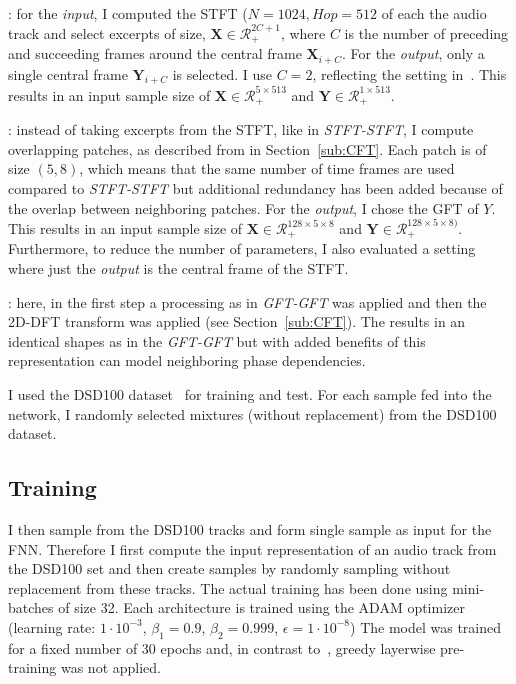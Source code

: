 \begin{description}[style=unboxed,leftmargin=0cm]
\item[STFT-STFT]: for the \emph{input}, I computed the STFT (\(N=1024, Hop=512\) of each the audio track and select excerpts of size, \(\mathbf{X} \in \mathcal{R}^{2C + 1}_{+} \), where \(C\) is the number of preceding and succeeding frames around the central frame \(\mathbf{X}_{i+C}\). For the \emph{output}, only a single central frame \(\mathbf{Y}_{i+C}\) is selected.
I use \(C=2\), reflecting the setting in~\cite{uhlich15}. This results in an input sample size of \(\mathbf{X} \in \mathcal{R}_{+}^{5 \times 513}\) and  \(\mathbf{Y} \in \mathcal{R}_{+}^{1 \times 513}\).

\item[GFT-GFT/GFT-STFT]: instead of taking excerpts from the STFT, like in \emph{STFT-STFT}, I compute overlapping patches, as described from in Section~\ref{sub:CFT}. Each patch is of size \((5, 8)\), which means that the same number of time frames are used compared to \emph{STFT-STFT} but additional redundancy has been added because of the overlap between neighboring patches.
For the \emph{output}, I chose the GFT of \(Y\).
This results in an input sample size of \(\mathbf{X} \in \mathcal{R}_{+}^{128 \times 5 \times 8}\) and  \(\mathbf{Y} \in \mathcal{R}_{+}^{128 \times 5 \times 8)}\).
Furthermore, to reduce the number of parameters, I also evaluated a setting where just the \emph{output} is the central frame of the STFT.

\item[CFT-CFT/CFT-STFT]: here, in the first step a processing as in \emph{GFT-GFT} was applied and then the 2D-DFT transform was applied (see Section~\ref{sub:CFT}).
The results in an identical shapes as in the \emph{GFT-GFT} but with added benefits of this representation can model neighboring phase dependencies.
\end{description}

I used the DSD100 dataset~\cite{ono15} for training and test. 
For each sample fed into the network, I randomly selected mixtures (without replacement) from the DSD100 dataset.

\subsection{Training}
I then sample from the DSD100 tracks and form single sample as input for the FNN.
Therefore I first compute the input representation of an audio track from the DSD100 set and then create samples by randomly sampling without replacement from these tracks.
The actual training has been done using mini-batches of size 32.
Each architecture is trained using the ADAM optimizer~\cite{kingma14} (learning rate: \(1 \cdot 10^{-3}\), \(\beta_1=0.9\), \(\beta_2=0.999\), \(\epsilon=1 \cdot 10^{-8}\))
The model was trained for a fixed number of 30 epochs and, in contrast to~\cite{uhlich15}, greedy layerwise pre-training was not applied.

